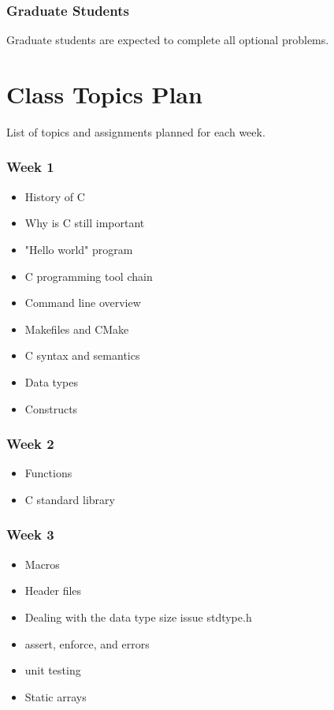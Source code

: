 \documentclass[a4paper,12pt]{report}
\begin{document}
\subsubsection*{Graduate Students}
Graduate students are expected to complete all optional problems.

\section*{Class Topics Plan}
List of topics and assignments planned for each week.

\subsubsection*{Week 1}
\begin{itemize}
\item History of C
\item Why is C still important
\item "Hello world" program
\item C programming tool chain
\item Command line overview
\item Makefiles and CMake
\item C syntax and semantics
\item Data types
\item Constructs
\end{itemize}

\subsubsection*{Week 2}
\begin{itemize}
\item Functions
\item C standard library
\end{itemize}

\subsubsection*{Week 3}
\begin{itemize}
\item Macros
\item Header files
\item Dealing with the data type size issue stdtype.h
\item assert, enforce, and errors
\item unit testing
\item Static arrays
\end{itemize}
\end{document}
